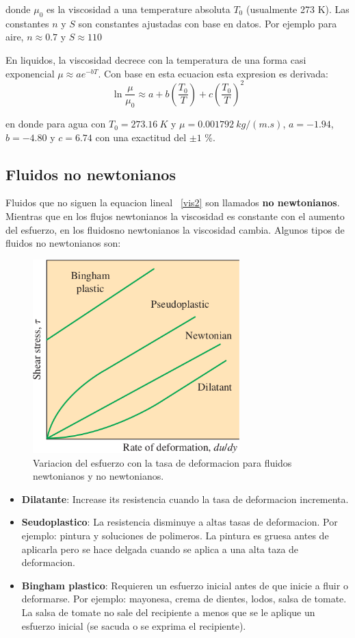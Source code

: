 \documentclass[10pt, oneside]{article}
\begin{document}
donde $\mu_0$ es la viscosidad a una temperature absoluta $T_0$ (usualmente 273 K). Las constantes $n$ y $S$ son constantes ajustadas con base en datos. Por ejemplo para aire, $n\approx 0.7$ y $S\approx 110$ 

En liquidos, la viscosidad decrece con la temperatura de una forma casi exponencial $\mu \approx ae^{-bT}$. Con base en esta ecuacion esta expresion es derivada:
\begin{equation}
\ln \frac{\mu}{\mu_0} \approx  a + b \left(\frac{T_0}{T}\right)+ c\left(\frac{T_0}{T}\right)^2
\label{visf}
\end{equation}

en donde para agua con $T_0 = 273.16\ K$ y $\mu = 0.001792\ kg/(m.s)$, $a=-1.94$, $b=-4.80$ y $c=6.74$ con una  exactitud del $\pm 1$ \%.

\subsection{Fluidos no newtonianos}
Fluidos que no siguen la equacion lineal ~\ref{vis2} son llamados \textbf{no newtonianos}. Mientras que en los flujos newtonianos la viscosidad es constante con el aumento del esfuerzo, en los fluidosno newtonianos la viscosidad cambia. Algunos tipos de fluidos no newtonianos son:

\begin{figure}[h]
\centering
\includegraphics[width=8cm]{nonew}
\caption{Variacion del esfuerzo con la tasa de deformacion para fluidos newtonianos y no newtonianos.}
\label{nonew}
\end{figure}

\begin{itemize}
\item \textbf{Dilatante}: Increase its resistencia cuando la tasa de deformacion incrementa.
\item \textbf{Seudoplastico}: La resistencia disminuye a altas tasas de deformacion. Por ejemplo: pintura y soluciones de polimeros. La pintura es gruesa antes de aplicarla pero se hace delgada cuando se aplica a una alta taza de deformacion.
\item \textbf{Bingham plastico}: Requieren un esfuerzo inicial antes de que inicie a fluir o deformarse. Por ejemplo: mayonesa, crema de dientes, lodos, salsa de tomate. La salsa de tomate no sale del recipiente a menos que se le aplique un esfuerzo inicial (se sacuda o se exprima el recipiente). 
\end{itemize}
\end{document}
